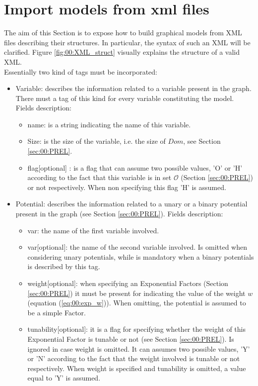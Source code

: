 \newpage
\chapter{Import models from xml files}
\label{00_XML_format}

The aim of this Section is to expose how to build graphical models from XML files describing their structures.
In particular, the syntax of such an XML will be clarified.
Figure \ref{fig:00:XML_struct} visually explains the structure of a valid XML.
\\
Essentially two kind of tags must be incorporated:
\begin{itemize}
\item Variable: describes the information related to a variable present in the graph. There must a tag of this kind for every variable constituting the model. Fields description:
\begin{itemize}
\item name: is a string indicating the name of this variable.
\item Size: is the size of the variable, i.e. the size of $Dom$, see Section \ref{sec:00:PREL}.
\item flag[optional] : is a flag that can assume two possible values, 'O' or 'H' according to the fact that this variable is in set $\mathcal{O}$ (Section \ref{sec:00:PREL}) or not respectively. When non specifying this flag 'H' is assumed.
\end{itemize}
\item Potential: describes the information related to a unary or a binary potential present in the graph (see Section \ref{sec:00:PREL}).
Fields description:
\begin{itemize}
\item var: the name of the first variable involved.
\item var[optional]: the name of the second variable involved. Is omitted when considering unary potentials, while is mandatory when a binary potentials is described by this tag.
\item weight[optional]: when specifying an Exponential Factors (Section \ref{sec:00:PREL}) it must be present for indicating the value of the weight $w$ (equation (\ref{eq:00:exp_w})). When omitting, the potential is assumed to be a simple Factor.
\item tunability[optional]: it is a flag for specifying whether the weight of this Exponential Factor is tunable or not (see Section \ref{sec:00:PREL}). Is ignored in case weight is omitted. It can assumes two possible values, 'Y' or 'N' according to the fact that the weight involved is tunable or not respectively. When weight is specified and tunability is omitted, a value equal to 'Y' is assumed.

\end{itemize}
\end{itemize}
